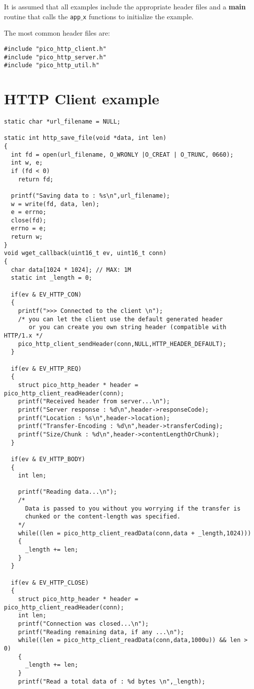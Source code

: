 It is assumed that all examples include the appropriate header files
and a \textbf{main} routine that calls the \texttt{app$\_$x} functions to initialize
the example.

The most common header files are:
\begin{verbatim}
#include "pico_http_client.h"
#include "pico_http_server.h"
#include "pico_http_util.h"
\end{verbatim}

\section{HTTP Client example}
\begin{verbatim}
static char *url_filename = NULL;

static int http_save_file(void *data, int len)
{
  int fd = open(url_filename, O_WRONLY |O_CREAT | O_TRUNC, 0660);
  int w, e;
  if (fd < 0)
    return fd;

  printf("Saving data to : %s\n",url_filename);
  w = write(fd, data, len);
  e = errno;
  close(fd);
  errno = e;
  return w;
}
void wget_callback(uint16_t ev, uint16_t conn)
{
  char data[1024 * 1024]; // MAX: 1M
  static int _length = 0;

  if(ev & EV_HTTP_CON)
  {
    printf(">>> Connected to the client \n");
    /* you can let the client use the default generated header
       or you can create you own string header (compatible with HTTP/1.x */
    pico_http_client_sendHeader(conn,NULL,HTTP_HEADER_DEFAULT);
  }

  if(ev & EV_HTTP_REQ)
  {
    struct pico_http_header * header = pico_http_client_readHeader(conn);
    printf("Received header from server...\n");
    printf("Server response : %d\n",header->responseCode);
    printf("Location : %s\n",header->location);
    printf("Transfer-Encoding : %d\n",header->transferCoding);
    printf("Size/Chunk : %d\n",header->contentLengthOrChunk);
  }

  if(ev & EV_HTTP_BODY)
  {
    int len;

    printf("Reading data...\n");
    /*
      Data is passed to you without you worrying if the transfer is 
      chunked or the content-length was specified.
    */
    while((len = pico_http_client_readData(conn,data + _length,1024)))
    {
      _length += len;
    }
  }

  if(ev & EV_HTTP_CLOSE)
  {
    struct pico_http_header * header = pico_http_client_readHeader(conn);
    int len;
    printf("Connection was closed...\n");
    printf("Reading remaining data, if any ...\n");
    while((len = pico_http_client_readData(conn,data,1000u)) && len > 0)
    {
      _length += len;
    }
    printf("Read a total data of : %d bytes \n",_length);


\end{verbatim}
